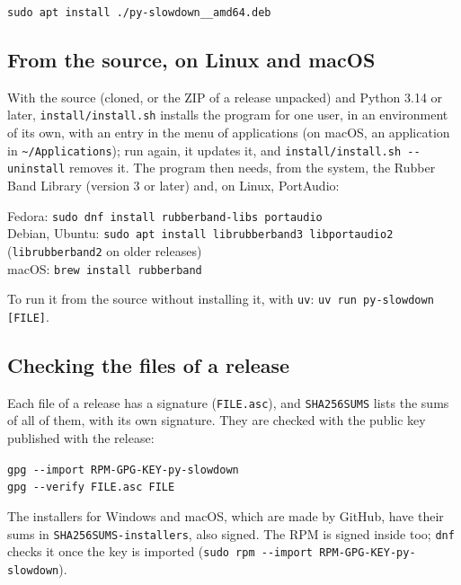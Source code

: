 \documentclass[12pt,
              article,
              oneside
              ]{memoir}
\renewenvironment{quote}%
 {\begin{list}{}%
              {\setlength\rightmargin{0pt}%
              \setlength\leftmargin{\parindent}}%
  \item[]\small\ignorespaces}
 {\unskip\end{list}}
\begin{document}
\begin{quote}
\texttt{sudo apt install ./py-slowdown\_\_amd64.deb}
\end{quote}

\subsection{From the source, on Linux and macOS}

%
With the source (cloned, or the ZIP of a release unpacked) and Python 3.14
or later, \texttt{install/install.sh} installs the program for one user, in
an environment of its own, with an entry in the menu of applications (on
macOS, an application in \texttt{\textasciitilde/Applications}); run again,
it updates it, and \texttt{install/install.sh -{}-uninstall} removes it. The
program then needs, from the system, the Rubber Band Library (version 3 or
later) and, on Linux, PortAudio:

\begin{quote}
Fedora: \texttt{sudo dnf install rubberband-libs portaudio}\\
Debian, Ubuntu: \texttt{sudo apt install librubberband3 libportaudio2}\\
(\texttt{librubberband2} on older releases)\\
macOS: \texttt{brew install rubberband}
\end{quote}

\noindent{}%
To run it from the source without installing it, with \texttt{uv}:
\texttt{uv run py-slowdown [FILE]}.

\subsection{Checking the files of a release}
\label{sec:signatures}

%
Each file of a release has a signature (\texttt{FILE.asc}), and
\texttt{SHA256SUMS} lists the sums of all of them, with its own signature.
They are checked with the public key published with the release:

\begin{quote}
\texttt{gpg -{}-import RPM-GPG-KEY-py-slowdown}\\
\texttt{gpg -{}-verify FILE.asc FILE}
\end{quote}

\noindent The installers for Windows and macOS, which are made by GitHub,
have their sums in \texttt{SHA256SUMS-installers}, also signed. The RPM is
signed inside too; \texttt{dnf} checks it once the key is imported
(\texttt{sudo rpm -{}-import RPM-GPG-KEY-py-slowdown}).
\end{document}
